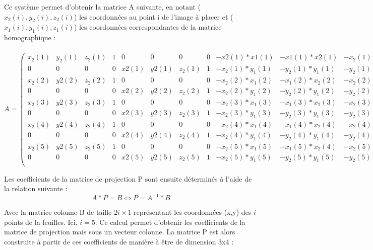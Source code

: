 \documentclass[blue]{ceri/sty/rapport}
\begin{document}
Ce système permet d'obtenir la matrice A suivante, en notant ($x_2(i),y_2(i),z_2(i)$) les coordonnées au point i de l'image à placer et ($x_1(i),y_1(i),z_1(i)$) les coordonnées correspondantes de la matrice homographique : \\
\\
\vspace{0.5cm}
\hspace{-0.5cm}
\setcounter{MaxMatrixCols}{11}
$A = \begin{pmatrix}x_2(1)&y_2(1)&z_2(1)&1&0&0&0&0&-x2(1)*x1(1)&-x1(1)*x2(1)&-x_2(1)*z_2(1)\\ 
0&0&0&0&x2(1)&y2(1)&z_2(1)&1&-x_2(1)*y_1(1)&-y_2(1)*y_1(1)&-y_2(1)*z_2(1)\\ 
x_2(2)&y2(2)&z_2(2)&1&0&0&0&0&-x_2(2)*x_1(2)&-x_1(2)*x_2(2)&-x_2(2)*z_2(2)\\ 
0&0&0&0&x2(2)&y2(2)&z_2(2)&1&-x_2(2)*y_1(2)&-y_2(2)*y_1(2)&-y_2(2)*z_2(2)\\ 
x_2(3)&y2(3)&z_2(3)&1&0&0&0&0&-x_2(3)*x_1(3)&-x_1(3)*x_2(3)&-x_2(3)*z_2(3)\\ 
0&0&0&0&x2(3)&y2(3)&z_2(3)&1&-x_2(3)*y_1(3)&-y_2(3)*y_1(3)&-y_2(3)*z_2(3)\\ 
x_2(4)&y2(4)&z_2(4)&1&0&0&0&0&-x_2(4)*x_1(4)&-x_1(4)*x_2(4)&-x_2(4)*z_2(4)\\ 
0&0&0&0&x2(4)&y2(4)&z_2(4)&1&-x_2(4)*y_1(4)&-y_2(4)*y_1(4)&-y_2(4)*z_2(4)\\ 
x_2(5)&y2(5)&z_2(5)&1&0&0&0&0&-x_2(5)*x_1(5)&-x_1(5)*x_2(4)&-x_2(5)*z_2(5)\\ 
0&0&0&0&x2(5)&y2(5)&z_2(5)&1&-x_2(5)*y_1(5)&-y_2(5)*y_1(5)&-y_2(5)*z_2(5)\\ 
\end{pmatrix} $
\vspace{0.5cm}

Les coefficients de la matrice de projection P sont ensuite déterminés à l'aide de la relation suivante : 
\\

 \begin{equation}
   A*P=B \Leftrightarrow P=A^{-1}*B
\end{equation}

Avec la matrice colonne B de taille $2i\times1$ représentant les coordonnées (x,y) des $i$ points de la feuilles. Ici, $i=5$.
Ce calcul permet d'obtenir les coefficients de la matrice de projection mais sous un vecteur colonne. La matrice P est alors construite à partir de ces coefficients de manière à être de dimension 3x4 : \\
\\
\end{document}
